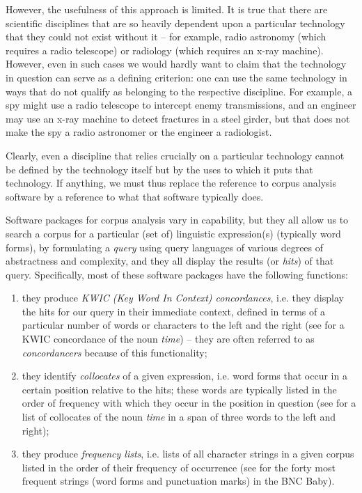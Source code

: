 However, the usefulness of this approach is limited. It is true that there are scientific disciplines that are so heavily dependent upon a particular technology that they could not exist without it -- for example, radio astronomy (which requires a radio telescope) or radiology (which requires an x\hyp{}ray machine). However, even in such cases we would hardly want to claim that the technology in question can serve as a defining criterion: one can use the same technology in ways that do not qualify as belonging to the respective discipline. For example, a spy might use a radio telescope to intercept enemy transmissions, and an engineer may use an x\hyp{}ray machine to detect fractures in a steel girder, but that does not make the spy a radio astronomer or the engineer a radiologist.

Clearly, even a discipline that relies crucially on a particular technology cannot be defined by the technology itself but by the uses to which it puts that technology. If anything, we must thus replace the reference to corpus analysis software by a reference to what that software typically does.

Software packages for corpus analysis vary in capability, but they all allow us to search a corpus for a particular (set of) linguistic expression(s) (typically word forms), by formulating a \emph{query}  using query languages of various degrees of abstractness and complexity,  and they all display the results (or \emph{hits})  of that query. Specifically, most of these software packages have the following functions:

\begin{enumerate}
\item they produce \emph{KWIC (Key Word In Context) concordances},  i.e. they display the hits  for our query  in their immediate context, defined in terms of a particular number of words or characters to the left and the right (see  for a KWIC concordance  of the noun  \emph{time}) -- they are often referred to as \textit{concordancers} because of this functionality;
\item they identify \emph{collocates}  of a given expression, i.e. word forms that occur in a certain position relative to the hits;  these words are typically listed in the order of frequency  with which they occur in the position in question (see  for a list of collocates  of the noun  \textit{time} in a span  of three words to the left and right);
\item they produce \emph{frequency lists}, i.e. lists of all character strings in a given corpus listed in the order of their frequency  of occurrence (see  for the forty most frequent strings (word forms and punctuation marks) in the BNC  Baby).
\end{enumerate}

